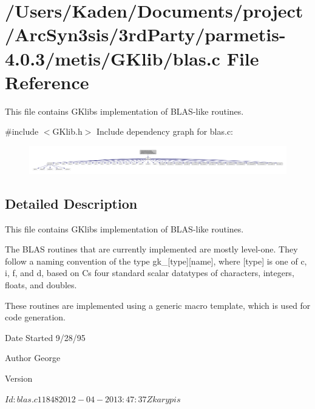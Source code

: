 \hypertarget{a00017}{}\section{/\+Users/\+Kaden/\+Documents/project/\+Arc\+Syn3sis/3rd\+Party/parmetis-\/4.0.3/metis/\+G\+Klib/blas.c File Reference}
\label{a00017}


This file contains G\+Klib\textquotesingle{}s implementation of B\+L\+A\+S-\/like routines.  


{\ttfamily \#include $<$G\+Klib.\+h$>$}\newline
Include dependency graph for blas.\+c\+:\nopagebreak
\begin{figure}[H]
\begin{center}
\leavevmode
\includegraphics[width=350pt]{a00018}
\end{center}
\end{figure}


\subsection{Detailed Description}
This file contains G\+Klib\textquotesingle{}s implementation of B\+L\+A\+S-\/like routines. 

The B\+L\+AS routines that are currently implemented are mostly level-\/one. They follow a naming convention of the type gk\+\_\+\mbox{[}type\mbox{]}\mbox{[}name\mbox{]}, where \mbox{[}type\mbox{]} is one of c, i, f, and d, based on C\textquotesingle{}s four standard scalar datatypes of characters, integers, floats, and doubles.

These routines are implemented using a generic macro template, which is used for code generation.

\begin{DoxyDate}{Date}
Started 9/28/95 
\end{DoxyDate}
\begin{DoxyAuthor}{Author}
George 
\end{DoxyAuthor}
\begin{DoxyVersion}{Version}
\begin{DoxyVerb}$Id: blas.c 11848 2012-04-20 13:47:37Z karypis $ \end{DoxyVerb}
 
\end{DoxyVersion}
